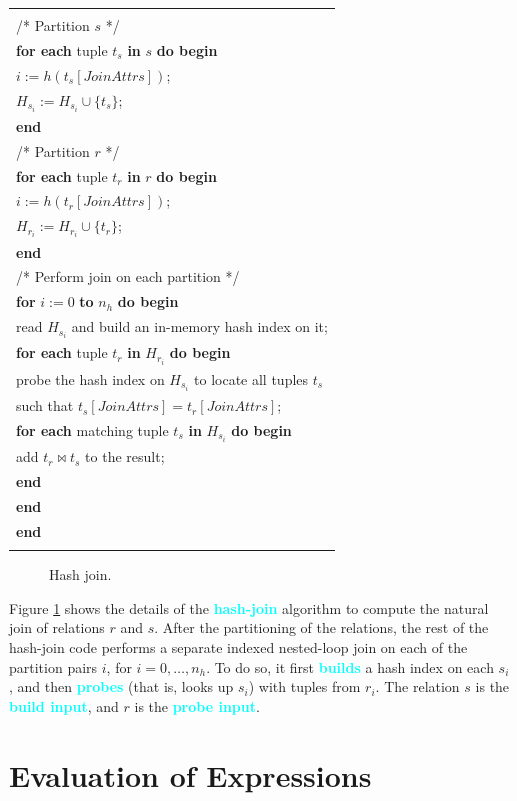\documentclass[a4paper,12pt,twoside,openany]{book}
\newcommand{\textcy}[1]{\textbf{\textcolor{cyan}{#1}}}
\begin{document}
\begin{center}
    \begin{tabular}{l}
        \hline\\
        /* Partition $s$ */\\
        \textbf{for each} tuple $t_s$ \textbf{in} $s$ \textbf{do begin}\\
        \qquad $i:=h(t_s[JoinAttrs])$;\\
        \qquad $H_{s_i}:=H_{s_i}\cup\{t_s\}$;\\
        \textbf{end}\\
        /* Partition $r$ */\\
        \textbf{for each} tuple $t_r$ \textbf{in} $r$ \textbf{do begin}\\
        \qquad $i:=h(t_r[JoinAttrs])$;\\
        \qquad $H_{r_i}:=H_{r_i}\cup\{t_r\}$;\\
        \textbf{end}\\
        /* Perform join on each partition */\\
        \textbf{for} $i:=0$ \textbf{to} $n_h$ \textbf{do begin}\\
        \qquad read $H_{s_i}$ and build an in-memory hash index on it;\\
        \qquad \textbf{for each} tuple $t_r$ \textbf{in} $H_{r_i}$ \textbf{do begin}\\
        \qquad\qquad probe the hash index on $H_{s_i}$ to locate all tuples $t_s$\\
        \qquad\qquad\qquad such that $t_s[JoinAttrs]=t_r[JoinAttrs]$;\\
        \qquad\qquad \textbf{for each} matching tuple $t_s$ \textbf{in} $H_{s_i}$ \textbf{do begin}\\
        \qquad\qquad\qquad add $t_r\Join t_s$ to the result;\\
        \qquad\qquad \textbf{end}\\
        \qquad \textbf{end}\\
        \textbf{end}\\\\
        \hline
    \end{tabular}
    \begin{figure}[htbp]
        \caption{Hash join.}
        \label{Fig:15.10}
    \end{figure}
\end{center}

Figure \ref{Fig:15.10} shows the details of the \textcy{hash-join} algorithm to compute the natural join of relations $r$ and $s$. After the partitioning of the relations, the rest of the hash-join code performs a separate indexed nested-loop join on each of the partition pairs $i$, for $i=0,\ldots,n_h$. To do so, it first \textcy{builds} a hash index on each $s_i$, and then \textcy{probes} (that is, looks up $s_i$) with tuples from $r_i$. The relation $s$ is the \textcy{build input}, and $r$ is the \textcy{probe input}.


\section{Evaluation of Expressions}

\end{document}
